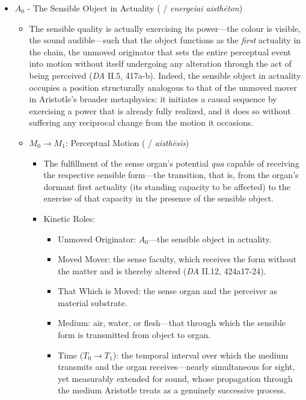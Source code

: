 \begin{itemize}
    \item $A_0$ - The Sensible Object in Actuality (  / \textit{energeiai aisthēton})
    \begin{itemize}
        \item The sensible quality is actually exercising its power---the colour is visible, the sound audible---such that the object functions as the \textit{first} actuality in the chain, the unmoved originator that sets the entire perceptual event into motion without itself undergoing any alteration through the act of being perceived (\textit{DA} II.5, 417a-b). Indeed, the sensible object in actuality occupies a position structurally analogous to that of the unmoved mover in Aristotle's broader metaphysics: it initiates a causal sequence by exercising a power that is already fully realized, and it does so without suffering any reciprocal change from the motion it occasions.
        \item $M_0 \rightarrow M_1$: Perceptual Motion ( / \textit{aisthēsis})
        \begin{itemize}
            \item The fulfillment of the sense organ's potential \textit{qua} capable of receiving the respective sensible form---the transition, that is, from the organ's dormant first actuality (its standing capacity to be affected) to the exercise of that capacity in the presence of the sensible object.
            \item Kinetic Roles:
            \begin{itemize}
                \item Unmoved Originator: $A_0$---the sensible object in actuality.
                \item Moved Mover: the sense faculty, which receives the form without the matter and is thereby altered (\textit{DA} II.12, 424a17-24).
                \item That Which is Moved: the sense organ and the perceiver as material substrate.
                \item Medium: air, water, or flesh---that through which the sensible form is transmitted from object to organ.
                \item Time ($T_0 \rightarrow T_1$): the temporal interval over which the medium transmits and the organ receives---nearly simultaneous for sight, yet measurably extended for sound, whose propagation through the medium Aristotle treats as a genuinely successive process.

\end{itemize}
\end{itemize}
\end{itemize}
\end{itemize}
